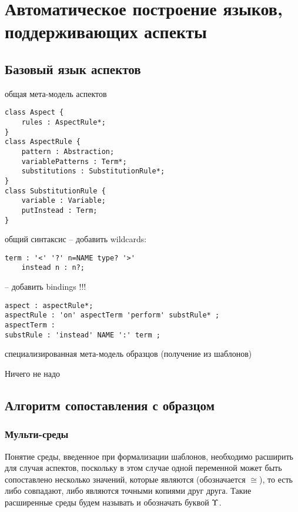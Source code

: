 \chapter{Автоматическое построение языков, поддерживающих аспекты}

\section{Базовый язык аспектов}
общая мета-модель аспектов

\begin{lstlisting}
class Aspect {
	rules : AspectRule*;
}
class AspectRule {
	pattern : Abstraction;
	variablePatterns : Term*;
	substitutions : SubstitutionRule*;
}
class SubstitutionRule {
	variable : Variable;
	putInstead : Term;
}
\end{lstlisting}

общий синтаксис
 -- добавить wildcards:
\begin{lstlisting}
term : '<' '?' n=NAME type? '>'
	instead n : n?;
\end{lstlisting}

 -- добавить bindings !!! 
\begin{lstlisting}
aspect : aspectRule*;
aspectRule : 'on' aspectTerm 'perform' substRule* ;
aspectTerm : 
substRule : 'instead' NAME ':' term ;
\end{lstlisting}

специализированная мета-модель образцов (получение из шаблонов)

   Ничего не надо

\section{Алгоритм сопоставления с образцом}

\subsection{Мульти-среды}


Понятие среды, введенное при формализации шаблонов, необходимо расширить для случая аспектов, поскольку в этом случае одной переменной может быть сопоставлено несколько значений, которые являются  (обозначается $\cong$), то есть либо совпадают, либо являются точными копиями друг друга. Такие расширенные среды будем называть  и обозначать буквой $\Upsilon$.


